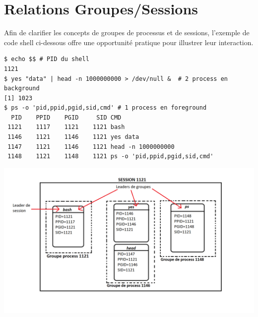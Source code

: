 \section{Relations Groupes/Sessions}

Afin de clarifier les concepts de groupes de processus et de sessions, l'exemple de code shell ci-dessous offre une opportunité pratique pour illustrer leur interaction.


\begin{lstlisting}
$ echo $$ # PID du shell
1121
$ yes "data" | head -n 1000000000 > /dev/null &  # 2 process en background
[1] 1023
$ ps -o 'pid,ppid,pgid,sid,cmd' # 1 process en foreground
  PID    PPID    PGID     SID CMD
 1121    1117    1121    1121 bash
 1146    1121    1146    1121 yes data
 1147    1121    1146    1121 head -n 1000000000
 1148    1121    1148    1121 ps -o 'pid,ppid,pgid,sid,cmd'
\end{lstlisting}

\includegraphics[width=1\textwidth]{img/relationshipSchema.png}